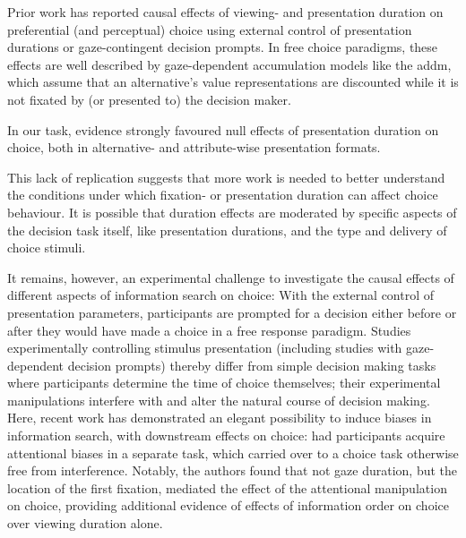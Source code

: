 \documentclass[11pt, a4paper, twocolumn, abstract]{scrartcl}
\begin{document}
Prior work has reported causal effects of viewing- and presentation duration on preferential (and perceptual) choice \parencite{shimojo2003GazeBiasBoth,armel2008BiasingSimpleChoices,parnamets2015BiasingMoralDecisions,tavares2017AttentionalDriftDiffusion,sui2020TimingGazecontingentDecision,liu2020ExploitingDynamicsEye,fisher2021IntertemporalChoicesAre} using external control of presentation durations or gaze-contingent decision prompts. In free choice paradigms, these effects are well described by gaze-dependent accumulation models like the \gls{addm}, which assume that an alternative's value representations are discounted while it is not fixated by (or presented to) the decision maker.

In our task, evidence strongly favoured null effects of presentation duration on choice, both in alternative- and attribute-wise presentation formats.

This lack of replication suggests that more work is needed to better understand the conditions under which fixation- or presentation duration can affect choice behaviour. It is possible that duration effects are moderated by specific aspects of the decision task itself, like presentation durations, and the type and delivery of choice stimuli. 

It remains, however, an experimental challenge to investigate the causal effects of different aspects of information search on choice: With the external control of presentation parameters, participants are prompted for a decision either before or after they would have made a choice in a free response paradigm. Studies experimentally controlling stimulus presentation (including studies with gaze-dependent decision prompts) thereby differ from simple decision making tasks where participants determine the time of choice themselves; their experimental manipulations interfere with and alter the natural course of decision making. Here, recent work has demonstrated an elegant possibility to induce biases in information search, with downstream effects on choice: \textcite{gwinn2019SpilloverEffectsAttentional} had participants acquire attentional biases in a separate task, which carried over to a choice task otherwise free from interference. Notably, the authors found that not gaze duration, but the location of the first fixation, mediated the effect of the attentional manipulation on choice, providing additional evidence of effects of information order on choice over viewing duration alone.

\end{document}
